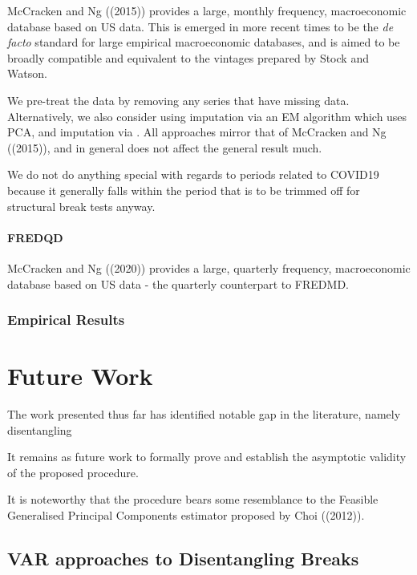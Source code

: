 \documentclass[
]{article}
\begin{document}
McCracken and Ng ((2015)) provides a large, monthly frequency,
macroeconomic database based on US data. This is emerged in more recent
times to be the \emph{de facto} standard for large empirical
macroeconomic databases, and is aimed to be broadly compatible and
equivalent to the vintages prepared by Stock and Watson.

We pre-treat the data by removing any series that have missing data.
Alternatively, we also consider using imputation via an EM algorithm
which uses PCA, and imputation via . All approaches mirror that of
McCracken and Ng ((2015)), and in general does not affect the general
result much.

We do not do anything special with regards to periods related to COVID19
because it generally falls within the period that is to be trimmed off
for structural break tests anyway.

\hypertarget{fredqd}{%
\paragraph{FREDQD}\label{fredqd}}

McCracken and Ng ((2020)) provides a large, quarterly frequency,
macroeconomic database based on US data - the quarterly counterpart to
FREDMD.

\hypertarget{empirical-results}{%
\subsubsection{Empirical Results}\label{empirical-results}}


\hypertarget{future-work}{%
\section{Future Work}\label{future-work}}

The work presented thus far has identified notable gap in the
literature, namely disentangling

It remains as future work to formally prove and establish the asymptotic
validity of the proposed procedure.

It is noteworthy that the procedure bears some resemblance to the
Feasible Generalised Principal Components estimator proposed by Choi
((2012)).

\hypertarget{var-approaches-to-disentangling-breaks}{%
\subsection{VAR approaches to Disentangling
Breaks}\label{var-approaches-to-disentangling-breaks}}
\end{document}
